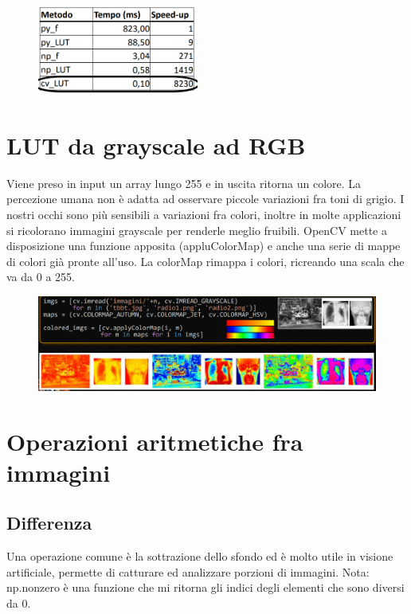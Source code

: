 \begin{figure}[htp]
	\includegraphics[width=150pt]{./immagini/output_lut.png}
	\label{img:output_lut}
\end{figure}

\section{LUT da grayscale ad RGB}

Viene preso in input un array lungo 255 e in uscita ritorna un colore. La percezione umana non è adatta ad osservare piccole variazioni fra toni di grigio. I nostri occhi sono più sensibili a variazioni fra colori, inoltre in molte applicazioni si ricolorano immagini grayscale per renderle meglio fruibili. OpenCV mette a disposizione una funzione apposita (appluColorMap) e anche una serie di mappe di colori già pronte all'uso. La colorMap rimappa i colori, ricreando una scala che va da 0 a 255.

\begin{figure}[htp]
	\includegraphics[width=\linewidth]{./immagini/LUT_colored.png}
	\label{img:LUT_colored}
\end{figure}

\section{Operazioni aritmetiche fra immagini}

\subsection{Differenza}

Una operazione comune è la sottrazione dello sfondo ed è molto utile in visione artificiale, permette di catturare ed analizzare porzioni di immagini. Nota: np.nonzero è una funzione che mi ritorna gli indici degli elementi che sono diversi da 0.

